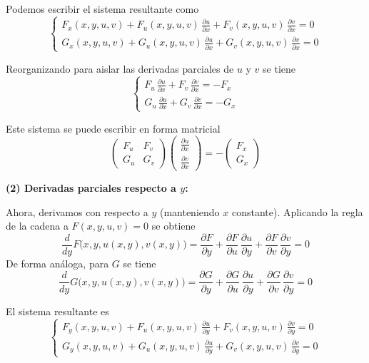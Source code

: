 \documentclass{article}
\begin{document}
Podemos escribir el sistema resultante como
\[
\begin{cases}
F_x(x,y,u,v)+ F_u(x,y,u,v)\,\frac{\partial u}{\partial x}+ F_v(x,y,u,v)\,\frac{\partial v}{\partial x}=0 \\
G_x(x,y,u,v)+ G_u(x,y,u,v)\,\frac{\partial u}{\partial x}+ G_v(x,y,u,v)\,\frac{\partial v}{\partial x}=0
\end{cases}
\]

Reorganizando para aislar las derivadas parciales de \( u \) y \( v \) se tiene
\[
\begin{cases}
F_u\,\frac{\partial u}{\partial x}+ F_v\,\frac{\partial v}{\partial x}=-F_x \\
G_u\,\frac{\partial u}{\partial x}+ G_v\,\frac{\partial v}{\partial x}=-G_x
\end{cases}
\]

Este sistema se puede escribir en forma matricial
\[
\begin{pmatrix}
F_u & F_v \\
G_u & G_v
\end{pmatrix}
\begin{pmatrix}
\frac{\partial u}{\partial x} \\
\frac{\partial v}{\partial x}
\end{pmatrix}
=
-\begin{pmatrix}
F_x \\
G_x
\end{pmatrix}
\]

\medskip
\noindent \textbf{(2) Derivadas parciales respecto a \( y \):}

Ahora, derivamos con respecto a \( y \) (manteniendo \( x \) constante). Aplicando la regla de la cadena a \( F(x,y,u,v)=0 \) se obtiene
\[
\frac{d}{dy}F\bigl(x,y,u(x,y),v(x,y)\bigr)
=\frac{\partial F}{\partial y}+ \frac{\partial F}{\partial u}\,\frac{\partial u}{\partial y}+ \frac{\partial F}{\partial v}\,\frac{\partial v}{\partial y}=0
\]
De forma análoga, para \( G \) se tiene
\[
\frac{d}{dy}G\bigl(x,y,u(x,y),v(x,y)\bigr)
=\frac{\partial G}{\partial y}+ \frac{\partial G}{\partial u}\,\frac{\partial u}{\partial y}+ \frac{\partial G}{\partial v}\,\frac{\partial v}{\partial y}=0
\]

El sistema resultante es
\[
\begin{cases}
F_y(x,y,u,v)+ F_u(x,y,u,v)\,\frac{\partial u}{\partial y}+ F_v(x,y,u,v)\,\frac{\partial v}{\partial y}=0 \\
G_y(x,y,u,v)+ G_u(x,y,u,v)\,\frac{\partial u}{\partial y}+ G_v(x,y,u,v)\,\frac{\partial v}{\partial y}=0
\end{cases}
\]
\end{document}

